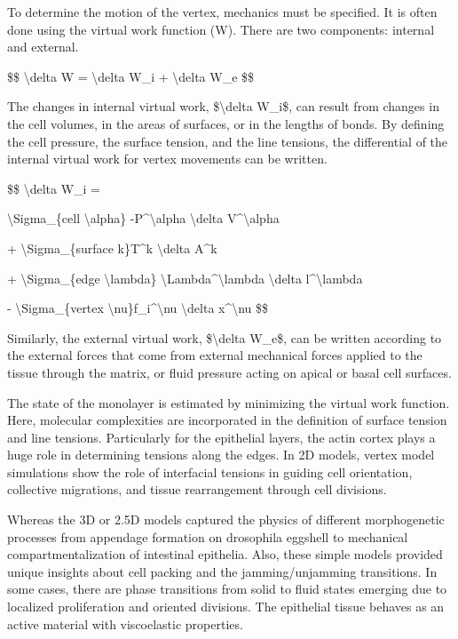 \documentclass[
]{article}
\begin{document}
To determine the motion of the vertex, mechanics must be specified. It
is often done using the virtual work function (W). There are two
components: internal and external.

\$\$ \textbackslash delta W = \textbackslash delta W\_i +
\textbackslash delta W\_e \$\$

The changes in internal virtual work, \$\textbackslash delta W\_i\$, can
result from changes in the cell volumes, in the areas of surfaces, or in
the lengths of bonds. By defining the cell pressure, the surface
tension, and the line tensions, the differential of the internal virtual
work for vertex movements can be written.

\$\$ \textbackslash delta W\_i =

\textbackslash Sigma\_\{cell \textbackslash alpha\}
-P\^{}\textbackslash alpha \textbackslash delta
V\^{}\textbackslash alpha

+ \textbackslash Sigma\_\{surface k\}T\^{}k \textbackslash delta A\^{}k

+ \textbackslash Sigma\_\{edge \textbackslash lambda\}
\textbackslash Lambda\^{}\textbackslash lambda \textbackslash delta
l\^{}\textbackslash lambda

- \textbackslash Sigma\_\{vertex
\textbackslash nu\}f\_i\^{}\textbackslash nu \textbackslash delta
x\^{}\textbackslash nu \$\$

Similarly, the external virtual work, \$\textbackslash delta W\_e\$, can
be written according to the external forces that come from external
mechanical forces applied to the tissue through the matrix, or fluid
pressure acting on apical or basal cell surfaces.

The state of the monolayer is estimated by minimizing the virtual work
function. Here, molecular complexities are incorporated in the
definition of surface tension and line tensions. Particularly for the
epithelial layers, the actin cortex plays a huge role in determining
tensions along the edges. In 2D models, vertex model simulations show
the role of interfacial tensions in guiding cell orientation, collective
migrations, and tissue rearrangement through cell divisions.

Whereas the 3D or 2.5D models captured the physics of different
morphogenetic processes from appendage formation on drosophila eggshell
to mechanical compartmentalization of intestinal epithelia. Also, these
simple models provided unique insights about cell packing and the
jamming/unjamming transitions. In some cases, there are phase
transitions from solid to fluid states emerging due to localized
proliferation and oriented divisions. The epithelial tissue behaves as
an active material with viscoelastic properties.
\end{document}

